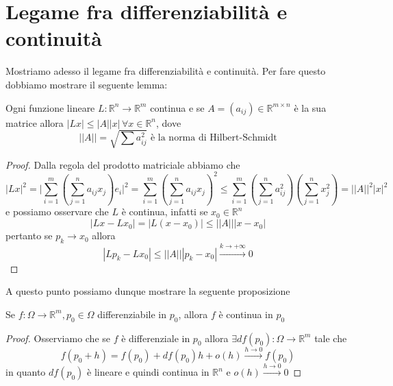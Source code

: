 \section{Legame fra differenziabilità e continuità}
Mostriamo adesso il legame fra differenziabilità e continuità. Per fare questo dobbiamo mostrare il seguente lemma:
\begin{lemma}
Ogni funzione lineare $L: \mathbb{R}^n \to \mathbb{R}^m$ continua e se $A = (a_{ij}) \in \mathbb{R}^{m \times n}$ è la sua matrice allora $|Lx| \leq | A | |x|  \, \forall x \in \mathbb{R}^n$, dove
$$
|| A || = \sqrt{\sum a_{ij}^2} \text{ è la norma di Hilbert-Schmidt}
$$
\end{lemma}
\begin{proof}
Dalla regola del prodotto matriciale abbiamo che
$$
|Lx|^2 = \Bigg| \sum_{i=1}^m \left( \sum_{j=1}^n a_{ij} x_j \right)e_i \Bigg|^2 = \sum_{i=1}^m \left( \sum_{j=1}^n a_{ij} x_j \right)^2 \leq \sum_{i=1}^m \left( \sum_{j=1}^n a_{ij}^2 \right)  \left( \sum_{j=1}^n x_j^2 \right) = || A ||^2 |x|^2
$$
e possiamo osservare che $L$ è continua, infatti se $x_0 \in \mathbb{R}^n$
$$
|Lx - Lx_0| = |L(x-x_0)| \leq || A || |x-x_0|
$$
pertanto se $p_k \to x_0$ allora
$$
|Lp_k - Lx_0| \leq || A || |p_k-x_0| \stackrel{k \to +\infty}{\to} 0
$$
\end{proof}
A questo punto possiamo dunque mostrare la seguente proposizione
\begin{prop}
Se $f: \Omega \to \mathbb{R}^m, p_0 \in \Omega$ differenziabile in $p_0$, allora $f$ è continua in $p_0$
\end{prop}
\begin{proof}
Osserviamo che se $f$ è differenziale in $p_0$ allora $\exists df(p_0): \Omega \to \mathbb{R}^m$ tale che
$$
f(p_0 + h) = f(p_0) + df(p_0)h + o(h) \stackrel{h \to 0}{\to} f(p_0)
$$
in quanto $df(p_0)$ è lineare e quindi continua in $\mathbb{R}^n$ e $o(h) \stackrel{h \to 0}{\to} 0$
\end{proof}
